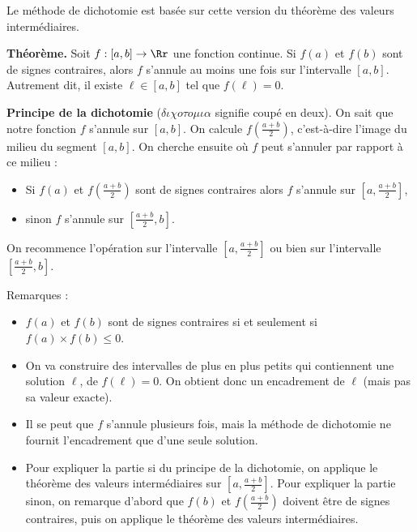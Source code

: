 \documentclass[11pt,class=report,crop=false]{standalone}
\begin{document}

\begin{cours}[Dichotomie]


Le méthode de dichotomie est basée sur cette version du théorème des valeurs intermédiaires.

\medskip

\textbf{Théorème.} Soit $f : [a,b] \to \Rr$ une fonction continue.
Si $f(a)$ et $f(b)$ sont de signes contraires, alors $f$ s'annule au moins une fois sur l'intervalle $[a,b]$. Autrement dit, il existe $\ell\in[a,b]$ tel que $f(\ell)=0$.

\medskip

\medskip 

\textbf{Principe de la dichotomie} ($\delta\iota\chi o \tau o\mu\iota\alpha$
signifie \og{}coupé en deux\fg{}).
On sait que notre fonction $f$ s'annule sur $[a,b]$. On calcule $f\left(\frac{a+b}{2}\right)$, c'est-à-dire l'image du milieu du segment $[a,b]$. On cherche ensuite où $f$ peut s'annuler par rapport à ce milieu :
\begin{itemize}
  \item Si $f(a)$ et $f\left(\frac{a+b}{2}\right)$ sont de signes contraires alors $f$ s'annule sur
  $\left[ a, \frac{a+b}{2}\right]$,
  
  \item sinon $f$ s'annule sur
  $\left[\frac{a+b}{2},b\right]$.
\end{itemize}



On recommence l'opération sur l'intervalle $\left[ a, \frac{a+b}{2}\right]$ ou bien sur l'intervalle $\left[\frac{a+b}{2},b\right]$.

Remarques :
\begin{itemize}
  \item $f(a)$ et $f(b)$ sont de signes contraires  si et seulement si $f(a) \times f(b) \le 0$.
  \item On va construire des intervalles de plus en plus petits qui contiennent une solution $\ell$, de $f(\ell) = 0$. On obtient donc un encadrement de $\ell$ (mais pas sa valeur exacte).
  \item Il se peut que $f$ s'annule plusieurs fois, mais la méthode de dichotomie ne fournit l'encadrement que d'une seule solution.
  \item Pour expliquer la partie \og{}si\fg{} du principe de la dichotomie, on applique le théorème des valeurs intermédiaires sur 
$\left[ a, \frac{a+b}{2}\right]$. Pour expliquer la partie \og{}sinon\fg{}, on remarque d'abord que 
$f(b)$ et $f\left(\frac{a+b}{2}\right)$ doivent être de signes contraires, puis on applique le théorème des valeurs intermédiaires.
\end{itemize}


\end{cours}
\end{document}
